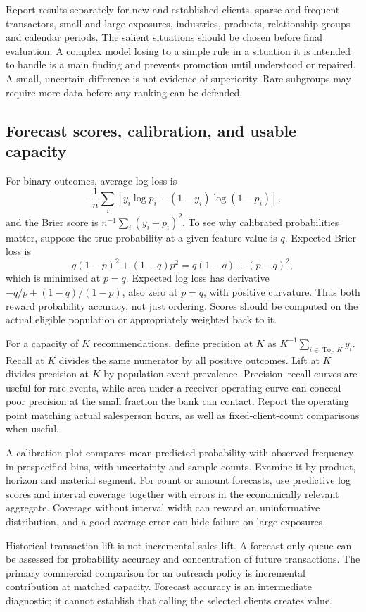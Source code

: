Report results separately for new and established clients, sparse and frequent transactors, small and large exposures, industries, products, relationship groups and calendar periods. The salient situations should be chosen before final evaluation. A complex model losing to a simple rule in a situation it is intended to handle is a main finding and prevents promotion until understood or repaired. A small, uncertain difference is not evidence of superiority. Rare subgroups may require more data before any ranking can be defended.

\subsection{Forecast scores, calibration, and usable capacity}

For binary outcomes, average log loss is
\[
 -\frac1n\sum_i[y_i\log p_i+(1-y_i)\log(1-p_i)],
\]
and the Brier score is $n^{-1}\sum_i(y_i-p_i)^2$. To see why calibrated probabilities matter, suppose the true probability at a given feature value is $q$. Expected Brier loss is
\[
 q(1-p)^2+(1-q)p^2=q(1-q)+(p-q)^2,
\]
which is minimized at $p=q$. Expected log loss has derivative $-q/p+(1-q)/(1-p)$, also zero at $p=q$, with positive curvature. Thus both reward probability accuracy, not just ordering. Scores should be computed on the actual eligible population or appropriately weighted back to it.

For a capacity of $K$ recommendations, define precision at $K$ as $K^{-1}\sum_{i\in\operatorname{Top}K}y_i$. Recall at $K$ divides the same numerator by all positive outcomes. Lift at $K$ divides precision at $K$ by population event prevalence. Precision--recall curves are useful for rare events, while area under a receiver-operating curve can conceal poor precision at the small fraction the bank can contact. Report the operating point matching actual salesperson hours, as well as fixed-client-count comparisons when useful.

A calibration plot compares mean predicted probability with observed frequency in prespecified bins, with uncertainty and sample counts. Examine it by product, horizon and material segment. For count or amount forecasts, use predictive log scores and interval coverage together with errors in the economically relevant aggregate. Coverage without interval width can reward an uninformative distribution, and a good average error can hide failure on large exposures.

Historical transaction lift is not incremental sales lift. A forecast-only queue can be assessed for probability accuracy and concentration of future transactions. The primary commercial comparison for an outreach policy is incremental contribution at matched capacity. Forecast accuracy is an intermediate diagnostic; it cannot establish that calling the selected clients creates value.


